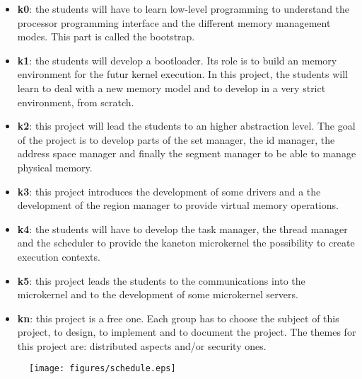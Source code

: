 \documentclass[10pt,a4wide]{article}
\begin{document}
\begin{multicols}{2}
\begin{itemize}
  \item
    \textbf{k0}: the students will have to learn low-level programming to
    understand the processor programming interface and the different
    memory management modes. This part is called the bootstrap.
  \item
    \textbf{k1}: the students will develop a bootloader. Its role is to
    build an memory environment for the futur kernel execution. In this
    project, the students will learn to deal with a new memory model
    and to develop in a very strict environment, from scratch.
  \item
    \textbf{k2}: this project will lead the students to an higher abstraction
    level. The goal of the project is to develop parts of the set manager,
    the id manager, the address space manager and finally the segment
    manager to be able to manage physical memory.
  \item
    \textbf{k3}: this project introduces the development of some drivers
    and a the development of the region manager to provide virtual memory
    operations.
  \item
    \textbf{k4}: the students will have to develop the task manager, the
    thread manager and the scheduler to provide the kaneton microkernel
    the possibility to create execution contexts.
  \item
    \textbf{k5}: this project leads the students to the communications
    into the microkernel and to the development of some microkernel servers.
  \item
    \textbf{kn}: this project is a free one. Each group has to choose the
    subject of this project, to design, to implement and to document
    the project. The themes for this project are: distributed aspects and/or
    security ones.
\end{itemize}



\end{multicols}



\begin{figure}[h]
\centerline{\texttt{[image: figures/schedule.eps]}}
\end{figure}
\end{document}
